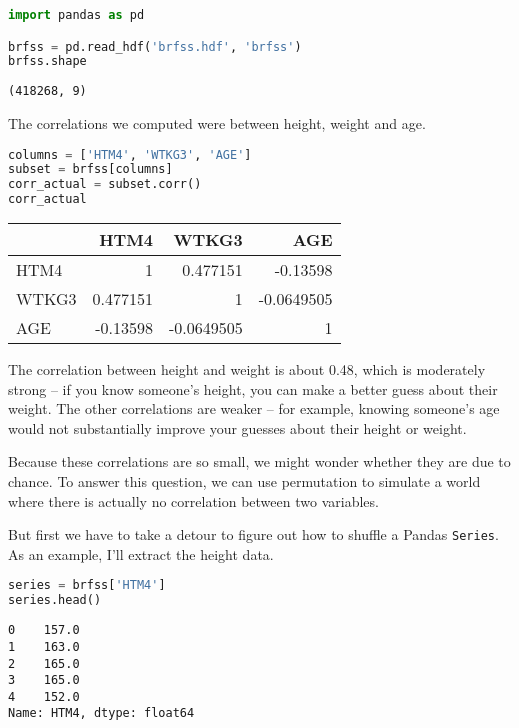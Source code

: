 \begin{lstlisting}[language=Python,style=source]
import pandas as pd

brfss = pd.read_hdf('brfss.hdf', 'brfss')
brfss.shape
\end{lstlisting}

\begin{lstlisting}[style=output]
(418268, 9)
\end{lstlisting}

\pagebreak

The correlations we computed were between height, weight and age.

\begin{lstlisting}[language=Python,style=source]
columns = ['HTM4', 'WTKG3', 'AGE']
subset = brfss[columns]
corr_actual = subset.corr()
corr_actual
\end{lstlisting}

\begin{tabular}{lrrr}
\toprule
 & HTM4 & WTKG3 & AGE \\
\midrule
HTM4 & 1 & 0.477151 & -0.13598 \\
WTKG3 & 0.477151 & 1 & -0.0649505 \\
AGE & -0.13598 & -0.0649505 & 1 \\
\bottomrule
\end{tabular}

The correlation between height and weight is about 0.48, which is
moderately strong -- if you know someone's height, you can make a better
guess about their weight. The other correlations are weaker -- for
example, knowing someone's age would not substantially improve your
guesses about their height or weight.

Because these correlations are so small, we might wonder whether they
are due to chance. To answer this question, we can use permutation to
simulate a world where there is actually no correlation between two
variables.

But first we have to take a detour to figure out how to shuffle a Pandas
\passthrough{\lstinline!Series!}. As an example, I'll extract the height
data.

\begin{lstlisting}[language=Python,style=source]
series = brfss['HTM4']
series.head()
\end{lstlisting}

\begin{lstlisting}[style=output]
0    157.0
1    163.0
2    165.0
3    165.0
4    152.0
Name: HTM4, dtype: float64
\end{lstlisting}

